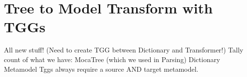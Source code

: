 \newpage
\section{Tree to Model Transform with TGGs}
\genHeader

All new stuff! (Need to create TGG between Dictionary and Transformer!)
Tally count of what we have:
	MocaTree (which we used in Parsing)
	Dictionary Metamodel
Tggs always require a source AND target metamodel.







